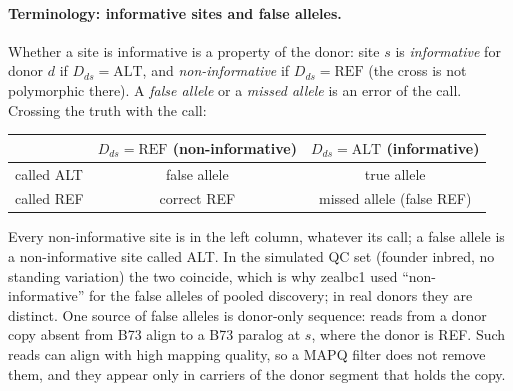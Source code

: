 \documentclass[11pt]{article}
\newcommand{\REF}{\mathrm{REF}}
\newcommand{\ALT}{\mathrm{ALT}}
\begin{document}
\paragraph{Terminology: informative sites and false alleles.} Whether a site is informative is a property of the donor: site $s$ is
\emph{informative} for donor $d$ if $D_{ds}=\ALT$, and \emph{non-informative} if $D_{ds}=\REF$ (the cross is not polymorphic there).
A \emph{false allele} or a \emph{missed allele} is an error of the call. Crossing the truth with the call:
\begin{center}
\begin{tabular}{lcc}
\toprule
 & $D_{ds}=\REF$ (non-informative) & $D_{ds}=\ALT$ (informative)\\
\midrule
called ALT & false allele & true allele\\
called REF & correct REF & missed allele (false REF)\\
\bottomrule
\end{tabular}
\end{center}
Every non-informative site is in the left column, whatever its call; a false allele is a non-informative site called ALT. In the
simulated QC set (founder inbred, no standing variation) the two coincide, which is why zealbc1 used ``non-informative'' for the false
alleles of pooled discovery; in real donors they are distinct. One source of false alleles is donor-only sequence: reads from a donor
copy absent from B73 align to a B73 paralog at $s$, where the donor is REF. Such reads can align with high mapping quality, so a MAPQ
filter does not remove them, and they appear only in carriers of the donor segment that holds the copy.
\end{document}
